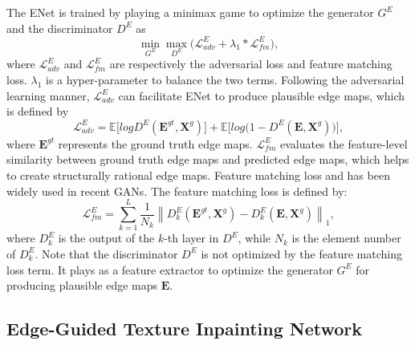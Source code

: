 The ENet is trained by playing a minimax game to optimize the generator $G^E$ and the discriminator $D^E$ as
\begin{equation}
\label{eq:loss_e}
\min\limits_{G^E} \max \limits_{D^E} \big(\mathcal{L}^E_{adv}+\lambda_1 * \mathcal{L}^E_{fm}\big),
\end{equation}
where $\mathcal{L}^E_{adv}$ and $\mathcal{L}^E_{fm}$ are respectively the adversarial loss and feature matching loss. 
$\lambda_1$ is a hyper-parameter to balance the two terms.
%
Following the adversarial learning manner, $\mathcal{L}^E_{adv}$ can facilitate ENet to produce plausible edge maps, which is defined by
\begin{equation} \label{eq:edge_adver}
\mathcal{L}^E_{adv}  =\mathbb{E}\big[logD^E(\boldsymbol{E}^{gt},\boldsymbol{X}^{g})\big] +\mathbb{E} \big[log\big(1-D^E ( \boldsymbol{E},\boldsymbol{X}^{g})\big)\big],
\end{equation}
where $\boldsymbol{E}^{gt}$ represents the ground truth edge maps. $\mathcal{L}^E_{fm}$ evaluates the feature-level similarity between ground truth edge maps and predicted edge maps, which helps to create structurally rational edge maps. 
Feature matching loss  and has been widely used in recent GANs.
The feature matching loss is defined by:
\begin{equation}
\label{eq:edge_fm}
\mathcal{L}^E_{fm}=\sum_{k=1}^L{\frac{1}{N_k}\left\| D^E_k(\boldsymbol{E}^{gt},\boldsymbol{X}^{g})- D^E_k(\boldsymbol{E},\boldsymbol{X}^{g})\right\|_1},
\end{equation}
where $D^E_k$ is the output of the $k$-th layer in $D^E$, while $N_k$ is the element number of $D^E_k$. 
Note that the discriminator $D^E$ is not optimized by the feature matching loss term. It plays as a feature extractor to optimize the generator $G^E$ for producing plausible edge maps $\boldsymbol{E}$.




\subsection{Edge-Guided Texture Inpainting Network}


